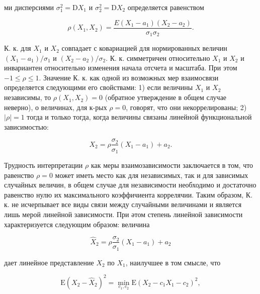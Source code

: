 \documentclass[10pt]{article}
\begin{document}
ми дисперсиями $\sigma_{1}^{2}=\mathrm{D} X_{1}$ и $\sigma_{2}^{2}=\mathrm{D} X_{2}$ определяется равенством



\[

\rho\left(X_{1}, X_{2}\right)=\frac{E\left(X_{1}-a_{1}\right)\left(X_{2}-a_{2}\right)}{\sigma_{1} \sigma_{2}} .

\]



К. к. для $X_{1}$ и $X_{2}$ совпадает с ковариацией для нормированных величин $\left(X_{1}-a_{1}\right) / \sigma_{1}$ и $\left(X_{2}-a_{2}\right) / \sigma_{2}$. К. к. симметричен относительно $X_{1}$ и $X_{2}$ и инвариантен относительно изменения начала отсчета и масштаба. При этом $-1 \leqslant \rho \leqslant 1$. Значение К. к. как одной из возможных мер взаимосвязи определяется следующими его свойствами: 1) если величины $X_{1}$ и $X_{2}$ независимы, то $\rho\left(X_{1}, X_{2}\right)=0$ (обратное утверждение в общем случае неверно), о величинах, для к-рых $\rho=0$, говорят, что они некоррелированы; 2) $|\rho|=1$ тогда и только тогда, когда величины связаны линейной функциональной зависимостью:



\[

X_{2}=\rho \frac{\sigma_{2}}{\sigma_{1}}\left(X_{1}-a_{1}\right)+a_{2} .

\]



Трудность интерпретации $\rho$ как меры взаимозависимости заключается в том, что равенство $\rho=0$ может иметь место как для независимых, так и для зависимых случайных величин, в общем случае для независимости необходимо и достаточно равенство нулю их максимального коэффичиента коррелячии. Таким образом, К. к. не исчерпывает все виды связи между случайными величинами и является лишь мерой линейной зависимости. При әтом степень линейной зависимости характеризуется следующим образом: величина



\[

\hat{X}_{2}=\rho \frac{\sigma_{2}}{\sigma_{1}}\left(X_{1}-a_{1}\right)+a_{2}

\]



дает линейное представление $X_{2}$ по $X_{1}$, наилучшее в том смысле, что



\[

\mathrm{E}\left(X_{2}-\hat{X}_{2}\right)^{2}=\min _{c_{1}, c_{2}} \mathrm{E}\left(X_{2}-c_{1} X_{1}-c_{2}\right)^{2},

\]
\end{document}
